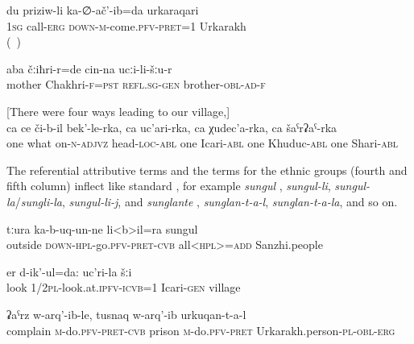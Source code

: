 \begin{exe}
	\ex	\label{ex:I came to Urkarakh by call}
	\gll   	du	priziw-li	ka-∅-ač'-ib=da	urkaraqari\\
		\textsc{1sg}	call-\textsc{erg}	\textsc{down-m}-come.\textsc{pfv-pret}=1	Urkarakh\\
	\glt 	 {} (\tie\ )

	\ex	\label{ex:My mother was in Chakhri, at her brother's place}
	\gll  	aba	čːiħri-r=de	cin-na	ucːi-li-šːu-r\\
		mother	Chakhri-\textsc{f=pst}		\textsc{refl.sg-gen}	brother-\textsc{obl-ad-f}\\
	\glt	{}

	\ex	\label{ex:one through the peak on which there is}[There were four ways leading to our village,]\\
	\gll  	ca	ce	či-b-il	bek'-le-rka,	ca	uc'ari-rka,	ca	χudec'a-rka,		ca	šaˁrʡaˁ-rka\\
		one	what	on-\textsc{n-adjvz}	head-\textsc{loc-abl}	one	Icari-\textsc{abl}	one	Khuduc-\textsc{abl}	one	Shari-\textsc{abl}\\
	\glt  	{}
\end{exe}

The referential attributive terms and the terms for the ethnic groups (fourth and fifth column) inflect like standard , for example \textit{sungul} ,  \textit{sungul-li},  \textit{sungul-la}\slash\textit{sungli-la},  \textit{sungul-li-j}, and \textit{sunglante} ,  \textit{sunglan-t-a-l},  \textit{sunglan-t-a-la}, and so on.

\begin{exe}
	\ex	\label{ex:All Sanzhi people came out (of their houses)}
	\gll	tːura	ka-b-uq-un-ne	li<b>il=ra	sungul\\
		outside	\textsc{down-hpl}-go.\textsc{pfv-pret-cvb}	all<\textsc{hpl>=add}	Sanzhi.people\\
	\glt  	{}

	\ex	\label{ex:We look: the village of Icari}
	\gll	er d-ik'-ul=da:	uc'ri-la	šːi  \\
		look 1/2\textsc{pl}-look.at.\textsc{ipfv-icvb}=1	Icari-\textsc{gen}	village\\
	\glt	{}

	\ex	\label{ex:The Urkarakh people complained and put him into prison}
	\gll	ʡaˁrz	w-arq'-ib-le,	tusnaq	w-arq'-ib	urkuqan-t-a-l   \\
		complain	\textsc{m-}do.\textsc{pfv-pret-cvb}	prison	\textsc{m}-do.\textsc{pfv-pret} Urkarakh.person-\textsc{pl-obl-erg}\\
	\glt	{}
\end{exe}

